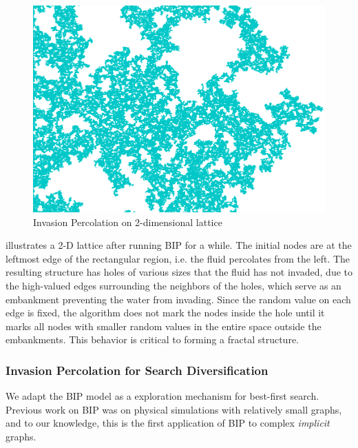 
\begin{figure}[tb]
 \centering
 \includegraphics[width=0.4\linewidth]{img/static/ip.png}
 \caption{Invasion Percolation on 2-dimensional lattice}
 \label{fig:ip}
\end{figure}

 illustrates a 2-D lattice after running BIP for a while. The initial nodes are 
at the leftmost edge of the rectangular region, i.e. the fluid percolates from the left. The
resulting structure has holes of various sizes that the fluid has not invaded, due to
the high-valued edges surrounding the neighbors of the holes, which serve as an embankment preventing the water from invading. Since the random value
on each edge is fixed, the algorithm does not mark the nodes inside the hole until it marks all nodes with smaller
random values in the entire space outside the embankments.
This behavior is critical to forming a fractal structure.

\subsubsection{Invasion Percolation for Search Diversification}
We adapt the BIP model as a exploration mechanism for best-first search.
Previous work on BIP was on physical simulations with relatively small graphs, 
and to our knowledge, this is the first application of BIP  to complex \emph{implicit} graphs.


